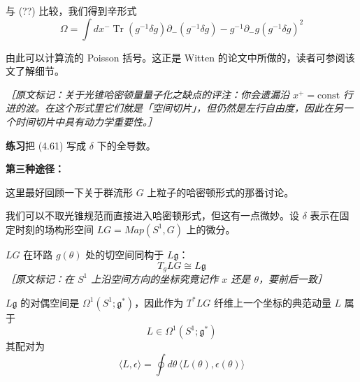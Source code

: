 与 (??) 比较，我们得到辛形式
\begin{equation}
  \Omega = \int dx^-\operatorname{Tr}\left(g^{-1}\delta g\right)\partial_-\left(g^{-1}\delta g\right) - g^{-1}\partial_- g\left(g^{-1}\delta g\right)^2
  \tag{4.61}
  \label{eq:4.61}
\end{equation}

由此可以计算流的 Poisson 括号。这正是 Witten 的论文中所做的，读者可参阅该文了解细节。

{\small\itshape ［原文标记：关于光锥哈密顿量量子化之缺点的评注：你会遗漏沿 $x^+=\mathrm{const}$ 行进的波。在这个形式里它们就是「空间切片」，但仍然是左行自由度，因此在另一个时间切片中具有动力学重要性。］}

\medskip
\noindent\textbf{练习}\quad 把 (4.61) 写成 $\delta$ 下的全导数。

\textbf{第三种途径：}

这里最好回顾一下关于群流形 $G$ 上粒子的哈密顿形式的那番讨论。

我们可以不取光锥规范而直接进入哈密顿形式，但这有一点微妙。设 $\delta$ 表示在固定时刻的场构形空间 $LG=Map(S^1,G)$ 上的微分。

$LG$ 在环路 $g(\theta)$ 处的切空间同构于 $L\mathfrak{g}$：
\begin{equation}
  T_g LG \cong L\mathfrak{g}
  \tag{4.62}
  \label{eq:4.62}
\end{equation}
{\small\itshape ［原文标记：在 $S^1$ 上沿空间方向的坐标究竟记作 $x$ 还是 $\theta$，要前后一致］}

$L\mathfrak{g}$ 的对偶空间是 $\Omega^1(S^1;\mathfrak{g}^*)$，因此作为 $T^*LG$ 纤维上一个坐标的典范动量 $L$ 属于
\begin{equation}
  L \in \Omega^1(S^1;\mathfrak{g}^*)
  \tag{4.63}
  \label{eq:4.63}
\end{equation}
其配对为
\begin{equation}
  \langle L, \epsilon\rangle = \oint d\theta\,\langle L(\theta), \epsilon(\theta)\rangle
  \tag{4.64}
  \label{eq:4.64}
\end{equation}

